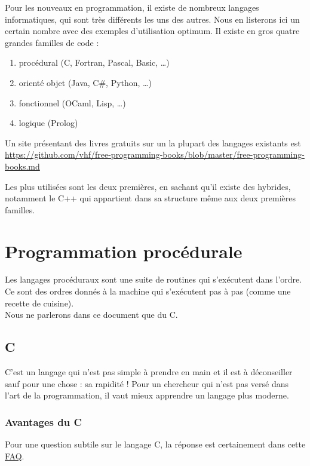 
Pour les nouveaux en programmation, il existe de nombreux langages informatiques, qui sont très 
différents les uns des autres. Nous en listerons ici un certain nombre avec des exemples d'utilisation 
optimum. Il existe en gros quatre grandes familles de code :

\begin{enumerate}
\item procédural (C, Fortran, Pascal, Basic, \ldots)
\item orienté objet (Java, C\#, Python, \ldots)
\item fonctionnel (OCaml, Lisp, \ldots)
\item logique (Prolog)
\end{enumerate}

Un site pr\'esentant des livres gratuits sur un la plupart des langages existants est
\url{https://github.com/vhf/free-programming-books/blob/master/free-programming-books.md}

Les plus utilisées sont les deux premières, en sachant qu'il existe des hybrides, notamment le C++ 
qui appartient dans sa structure même aux deux premières familles. 

\section{Programmation procédurale}

Les langages procéduraux sont une suite de routines qui s'exécutent dans l'ordre. Ce sont des ordres 
donnés à la machine qui s'exécutent pas à pas (comme une recette de cuisine).\\

Nous ne parlerons dans ce document que du C. 

\subsection{C}

C'est un langage qui n'est pas simple à prendre en main et il est \`a déconseiller sauf pour 
une chose : sa rapidité ! Pour un chercheur qui n'est pas versé dans l'art de la programmation,
il vaut mieux apprendre un langage plus moderne.

\subsubsection*{Avantages du C}
 Pour une question subtile sur le langage C, la réponse est certainement dans cette 
 \href{http://c-faq.com/}{FAQ}.
 
